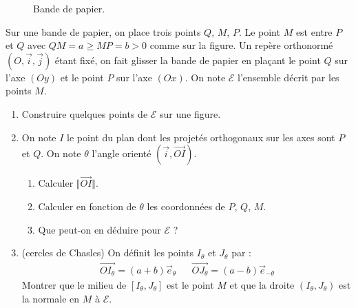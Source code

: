 \begin{figure}
	\begin{center}
	
	\end{center}
\caption{Bande de papier.}
\end{figure} 
Sur une bande de papier, on place trois points $Q$, $M$, $P$. Le point $M$ est entre $P$ et $Q$ avec $QM=a\geq MP=b>0$ comme sur la figure.\newline
Un repère orthonormé $(O,\overrightarrow{i},\overrightarrow{j})$ étant fixé, on fait glisser la bande de papier en plaçant le point $Q$ sur l'axe $(Oy)$ et le point $P$ sur l'axe $(Ox)$. On note $\mathcal E$ l'ensemble décrit par les points $M$.
\begin{enumerate}
    \item Construire quelques points de $\mathcal E$ sur une figure.
    \item On note $I$ le point du plan dont les projetés orthogonaux sur les axes sont $P$ et $Q$. On note  $\theta$ l'angle orienté $(\overrightarrow{i},\overrightarrow{OI})$.
    \begin{enumerate}
       \item Calculer $\Vert \overrightarrow{OI} \Vert$.
       \item  Calculer en fonction de $\theta$ les coordonnées de $P$, $Q$, $M$.
       \item Que peut-on en déduire pour $\mathcal E$ ?
    \end{enumerate}

\item (cercles de Chasles) On définit les points $I_\theta$ et $J_\theta$ par :
\begin{align*}
 \overrightarrow{OI_\theta}=(a+b)\overrightarrow{e}_\theta & &
 \overrightarrow{OJ_\theta}=(a-b)\overrightarrow{e}_{-\theta}
\end{align*}
Montrer que le milieu de $[I_\theta, J_\theta]$ est le point $M$ et que la droite $(I_\theta, J_\theta)$ est la normale en $M$ à $\mathcal E$. 
\end{enumerate}